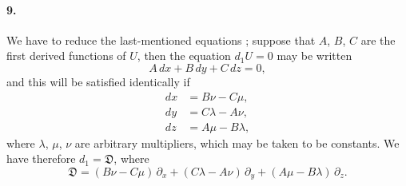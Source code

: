 \documentclass[11pt,a4paper]{book}
\begin{document}
\paragraph{9.}
We   have  to   reduce   the   last-mentioned    equations ;    suppose   that   $A$,   $B$,  $C$  are
the  first  derived  functions  of  $U$,  then  the  equation  $d_1 U = 0$  may  be  written
\[
A\, dx + B\, dy + C\, dz = 0,
\]
and  this  will  be  satisfied  identically  if
\begin{align*}
dx &= B\nu - C\mu, \\
dy &= C\lambda - A\nu, \\
dz &= A\mu - B\lambda,
\end{align*}
where  $\lambda$,  $\mu$,  $\nu$  are  arbitrary  multipliers,  which  may  be   taken   to   be   constants.     We  have
therefore  $d_1 = \mathfrak{D}$,  where
\[
\mathfrak{D} = (B\nu - C\mu) \, \partial_x + (C\lambda - A\nu) \, \partial_y + (A\mu - B\lambda) \, \partial_z.
\]
\end{document}
